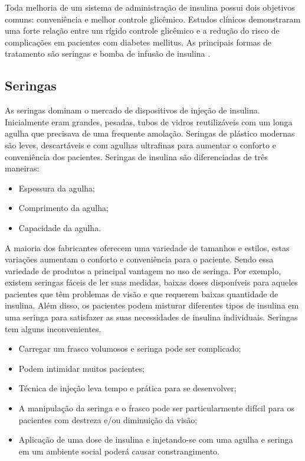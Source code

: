 Toda melhoria de um sistema de administração de insulina possui dois objetivos comuns: conveniência e melhor controle glicêmico. Estudos clínicos demonstraram uma forte relação entre um rígido controle glicêmico e a redução do risco de complicações em pacientes com diabetes mellitus. As principais formas de tratamento são seringas e bomba de infusão de insulina \cite{magnolti2007update}.

\subsection{Seringas}
As seringas dominam o mercado de dispositivos de injeção de insulina. Inicialmente eram grandes, pesadas, tubos de vidros reutilizáveis com um longa agulha que precisava de uma frequente amolação. Seringas de plástico modernas são leves, descartáveis e com agulhas ultrafinas para aumentar o conforto e conveniência dos pacientes. Seringas de insulina são diferenciadas de três maneiras: 

\begin{itemize}
\item Espessura da agulha;
\item Comprimento da agulha;
\item Capacidade da agulha.
\end{itemize}

A maioria dos fabricantes oferecem uma variedade de tamanhos e estilos, estas variações aumentam o conforto e conveniência para o paciente. Sendo essa variedade de produtos a principal vantagem no uso de seringa. Por exemplo, existem seringas fáceis de ler suas medidas, baixas doses disponíveis para aqueles pacientes que têm problemas de visão e que requerem baixas quantidade de insulina. Além disso, os pacientes podem misturar diferentes tipos de insulina em uma seringa para satisfazer as suas necessidades de insulina individuais. Seringas tem alguns inconvenientes. 

\begin{itemize}
\item Carregar um frasco volumosos e seringa pode ser complicado;
\item Podem intimidar muitos pacientes;
\item Técnica de injeção leva tempo e prática para se desenvolver;
\item A manipulação da seringa e o frasco pode ser particularmente difícil para os pacientes com destreza e/ou diminuição da visão;
\item Aplicação de uma dose de insulina e injetando-se com uma agulha e seringa em um ambiente social poderá causar constrangimento.
\end{itemize}

